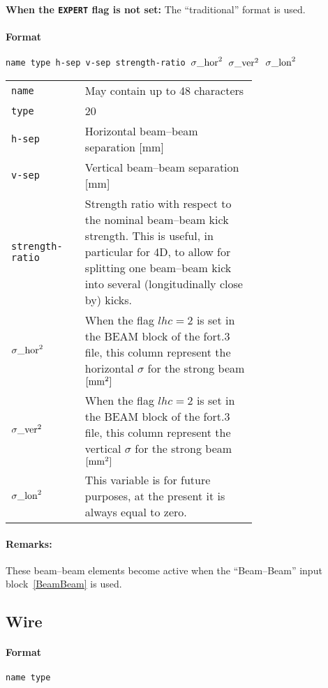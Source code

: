 \bigskip
\noindent\textbf{When the \texttt{EXPERT} flag is not set:}
The ``traditional'' format is used.

\paragraph{Format} \texttt{name type h-sep v-sep strength-ratio ${\sigma\_\rm{hor}}^2$ ${\sigma\_\rm{ver}}^2$ ${\sigma\_\rm{lon}}^2$}

\bigskip
\begin{tabular}{@{}lp{0.7\linewidth}}
    \texttt{name}  & May contain up to 48 characters \\
    \texttt{type}  & 20 \\
    \texttt{h-sep} & Horizontal beam--beam separation [mm] \\
    \texttt{v-sep} & Vertical beam--beam separation [mm] \\
    \texttt{strength-ratio} & Strength ratio with respect to the nominal beam--beam kick strength. This is useful, in particular for 4D, to allow for splitting one beam--beam kick into several (longitudinally close by) kicks. \\
    \texttt{${\sigma\_\rm{hor}}^2$} & When the flag $lhc=2$ is set in the BEAM block of the fort.3 file, this column represent the horizontal $\sigma$ for the strong beam $\rm{[mm^2]}$ \\
    \texttt{${\sigma\_\rm{ver}}^2$} & When the flag $lhc=2$ is set in the BEAM block of the fort.3 file, this column represent the vertical $\sigma$ for the strong beam $\rm{[mm^2]}$ \\
    \texttt{${\sigma\_\rm{lon}}^2$} & This variable is for future purposes, at the present it is always equal to zero.
\end{tabular}

\paragraph{Remarks:}
These beam--beam elements become active when the ``Beam--Beam'' input block~\ref{BeamBeam} is used.

\subsection{Wire} \label{WIRE}

\paragraph{Format} \texttt{name type}


